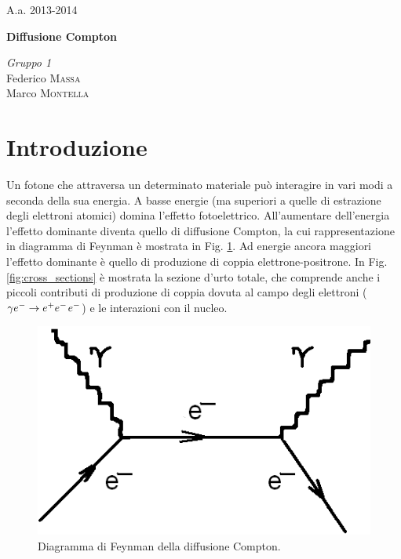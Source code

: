 \documentclass[8pt]{extarticle}
\begin{document}
\justify
\printindex
\Large{A.a. 2013-2014}
\vspace{10cm}
\begin{center}
\Huge\textbf{Diffusione Compton}
\end{center}

\vspace{2cm}
\begin{flushleft}
\textit{Gruppo \textsc{1}} \\
\medskip
Federico \textsc{Massa} \\ 
Marco \textsc{Montella}
\end{flushleft}



\newpage

\begin{abstract}
\justify
 

\end{abstract}
\bigskip

\section{Introduzione} \label{sec:intro}
Un fotone che attraversa un determinato materiale può interagire in vari modi a seconda della sua energia. A basse energie (ma superiori a quelle di estrazione degli elettroni atomici) domina l'effetto fotoelettrico. All'aumentare dell'energia l'effetto dominante diventa quello di diffusione Compton, la cui rappresentazione in diagramma di Feynman è mostrata in Fig. \ref{fig:feynman}. Ad energie ancora maggiori l'effetto dominante è quello di produzione di coppia elettrone-positrone. In Fig. \ref{fig:cross_sections} è mostrata la sezione d'urto totale, che comprende anche i piccoli contributi di produzione di coppia dovuta al campo degli elettroni ($\gamma e^- \rightarrow e^+ e^- \hspace{1 pt} e^-$) e le interazioni con il nucleo. 

\begin{figure}
\begin{center}
\includegraphics[scale=0.5]{feynman}
\caption{Diagramma di Feynman della diffusione Compton.}
\label{fig:feynman}
\end{center}
\end{figure}
\end{document}
